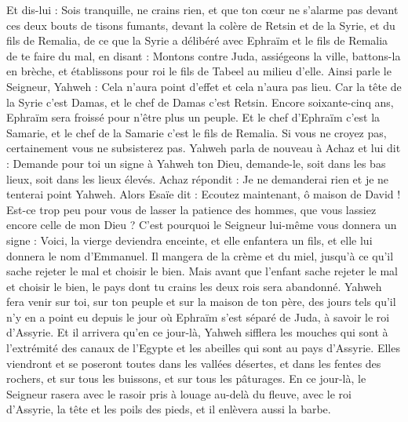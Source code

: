 \begin{multicols}{2}
Et dis-lui : Sois tranquille, ne crains rien, et que ton cœur ne s'alarme pas devant ces deux bouts de tisons fumants, devant la colère de Retsin et de la Syrie, et du fils de Remalia, 
de ce que la Syrie a délibéré avec Ephraïm et le fils de Remalia de te faire du mal, en disant :
Montons contre Juda, assiégeons la ville, battons-la en brèche, et établissons pour roi le fils de Tabeel au milieu d'elle.
Ainsi parle le Seigneur, Yahweh : Cela n'aura point d'effet et cela n'aura pas lieu.
Car la tête de la Syrie c'est Damas, et le chef de Damas c'est Retsin. Encore soixante-cinq ans, Ephraïm sera froissé pour n'être plus un peuple.
Et le chef d'Ephraïm c'est la Samarie, et le chef de la Samarie c'est le fils de Remalia. Si vous ne croyez pas, certainement vous ne subsisterez pas.
Yahweh parla de nouveau à Achaz et lui dit :
Demande pour toi un signe à Yahweh ton Dieu, demande-le, soit dans les bas lieux, soit dans les lieux élevés.
Achaz répondit : Je ne demanderai rien et je ne tenterai point Yahweh.
Alors Esaïe dit : Ecoutez maintenant, ô maison de David ! Est-ce trop peu pour vous de lasser la patience des hommes, que vous lassiez encore celle de mon Dieu ?
C'est pourquoi le Seigneur lui-même vous donnera un signe : Voici, la vierge deviendra enceinte, et elle enfantera un fils, et elle lui donnera le nom d'Emmanuel.
Il mangera de la crème et du miel, jusqu'à ce qu'il sache rejeter le mal et choisir le bien.
Mais avant que l'enfant sache rejeter le mal et choisir le bien, le pays dont tu crains les deux rois sera abandonné.
Yahweh fera venir sur toi, sur ton peuple et sur la maison de ton père, des jours tels qu'il n'y en a point eu depuis le jour où Ephraïm s'est séparé de Juda, à savoir le roi d'Assyrie.
Et il arrivera qu'en ce jour-là, Yahweh sifflera les mouches qui sont à l'extrémité des canaux de l'Egypte et les abeilles qui sont au pays d'Assyrie.
Elles viendront et se poseront toutes dans les vallées désertes, et dans les fentes des rochers, et sur tous les buissons, et sur tous les pâturages.
En ce jour-là, le Seigneur rasera avec le rasoir pris à louage au-delà du fleuve, avec le roi d'Assyrie, la tête et les poils des pieds, et il enlèvera aussi la barbe.

\end{multicols}
